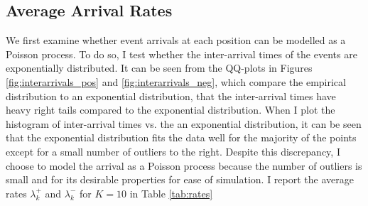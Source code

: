 \subsection{Average Arrival Rates}\label{ch:poisson}
We first examine whether event arrivals at each position can be modelled as a Poisson process. To do so, I test whether the inter-arrival times of the events are exponentially distributed. It can be seen from the QQ-plots in Figures \ref{fig:interarrivals_pos} and \ref{fig:interarrivals_neg}, which compare the empirical distribution to an exponential distribution, that the inter-arrival times have heavy right tails compared to the exponential distribution. When I plot the histogram of inter-arrival times vs. the an exponential distribution, it can be seen that the exponential distribution fits the data well for the majority of the points except for a small number of outliers to the right. Despite this discrepancy, I choose to model the arrival as a Poisson process because the number of outliers is small and for its desirable properties for ease of simulation. I report the average rates $\lambda^+_k$ and $\lambda^-_k$ for $K=10$ in Table \ref{tab:rates}

